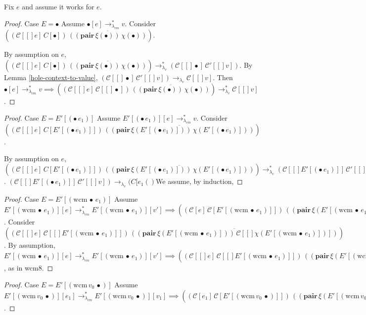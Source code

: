 \documentclass[ms,electronic,twosidetoc,letterpaper,chaptercenter,parttop]{byumsphd}
\newcommand{\pair}[2]{((\mathbf{pair}\,#1)\,#2)}
\newcommand{\eval}[1]{\overline{#1}}
\newcommand{\lvrr}{\rightarrow_{\lambda_v}}
\newcommand{\lvrrs}{\rightarrow_{\lambda_v}^{*}}
\newcommand{\cmrrs}{\rightarrow_{\lambda_{cm}}^{*}}
\newcommand{\C}[1]{\mathcal{C}[#1]}
\newcommand{\Cp}[1]{\mathcal{C}'[#1]}
\newcommand{\app}[2]{(#1\,#2)}
\newcommand{\wcm}[2]{(\mathrm{wcm}\,#1\,#2)}
\newcommand{\hole}{\bullet}
\begin{document}
Fix $e$ and assume it works for $e$.

\begin{proof}{Case $E=\hole$}
Assume $\hole[e]\cmrrs v$. Consider $((\C[e]\,C[\hole])\,\eval{\pair{\xi(\hole)}{\chi(\hole)}})$.

By assumption on $e$, $((\C[e]\,C[\hole])\,\eval{\pair{\xi(\hole)}{\chi(\hole)}})\lvrrs (\C[\hole]\,\Cp[v])$.
By Lemma \ref{hole-context-to-value}, $(\C[\hole]\,\Cp[v])\lvrr\C[v]$.
Then $\hole[e]\cmrrs v\implies((\C[e]\,\C[\hole])\,\eval{\pair{\xi(\hole)}{\chi(\hole)}})\lvrrs \C[v]$.
\end{proof}

\begin{proof}{Case $E=E'[\app{\hole}{e_1}]$}
Assume $E'[\app{\hole}{e_1}][e]\cmrrs v$. Consider $((\C[e]\,C[E'[\app{\hole}{e_1}]])\,\eval{\pair{\xi(E'[\app{\hole}{e_1}])}{\chi(E'[\app{\hole}{e_1}])}})$.

By assumption on $e$, $((\C[e]\,C[E'[\app{\hole}{e_1}]])\,\eval{\pair{\xi(E'[\app{\hole}{e_1}])}{\chi(E'[\app{\hole}{e_1}])}})\lvrrs (\C[E'[\app{\hole}{e_1}]]\,\Cp[v])$. $(\C[E'[\app{\hole}{e_1}]]\,\Cp[v])\lvrr(C[e_1()$We assume, by induction, 
\end{proof}

\begin{proof}{Case $E=E'[\wcm{\hole}{e_1}]$}
Assume $E'[\wcm{\hole}{e_1}][e]\cmrrs E'[\wcm{\hole}{e_1}][v']\implies\app{\app{\C{e}}{\C{E'[\wcm{\hole}{e_1}]}}}{\eval{\pair{\xi(E'[\wcm{\hole}{e_1}])}{\C{\chi(E'[\wcm{\hole}{e_1}])}}}}\lvrrs\app{\C{E'[\wcm{\hole}{e_1}]}}{\Cp{v'}}$.
Consider $((\C[e]\,\C[E'[\wcm{\hole}{e_1}]])\,\eval{\pair{\xi(E'[\wcm{\hole}{e_1}])}{\C[\chi(E'[\wcm{\hole}{e_1}])]}})$.
By assumption, $E'[\wcm{\hole}{e_1}][e]\cmrrs E'[\wcm{\hole}{e_1}][v']\implies((\C[e]\,\C[E'[\wcm{\hole}{e_1}]])\,\eval{\pair{\xi(E'[\wcm{\hole}{e_1}])}{\C[\chi(E'[\wcm{\hole}{e_1}])]}})\lvrr(\C[E'[\wcm{\hole}{e_1}]]\,\Cp[v'])$, as in wcm8.


\end{proof}

\begin{proof}{Case $E=E'[\wcm{v_0}{\hole}]$}
Assume $E'[\wcm{v_0}{\hole}][e_1]\cmrrs E'[\wcm{v_0}{\hole}][v_1]\implies\app{\app{\C{e_1}}{\C{E'[\wcm{v_0}{\hole}]}}}{\eval{\pair{\xi(E'[\wcm{v_0}{\hole}])}{\C{\chi(E'[\wcm{v_0}{\hole}])}}}}\lvrrs\app{\C{E'[\wcm{v_0}{\hole}]}}{\C{v_1}}$.
\end{proof}
\end{document}
